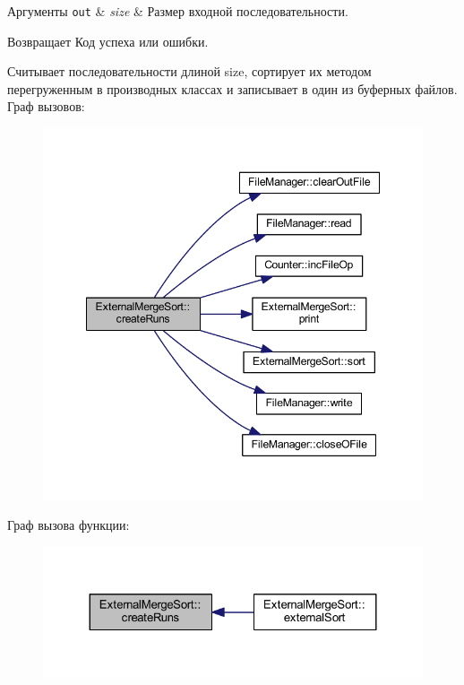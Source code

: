 \begin{DoxyParams}[1]{Аргументы}
\mbox{\tt out}  & {\em size} & Размер входной последовательности. \\
\hline
\end{DoxyParams}
\begin{DoxyReturn}{Возвращает}
Код успеха или ошибки.
\end{DoxyReturn}
Считывает последовательности длиной size, сортирует их методом перегруженным в производных классах и записывает в один из буферных файлов. Граф вызовов\+:\nopagebreak
\begin{figure}[H]
\begin{center}
\leavevmode
\includegraphics[width=348pt]{class_external_merge_sort_aae72743234c39c35a3460fecefa3a1f0_cgraph}
\end{center}
\end{figure}
Граф вызова функции\+:\nopagebreak
\begin{figure}[H]
\begin{center}
\leavevmode
\includegraphics[width=324pt]{class_external_merge_sort_aae72743234c39c35a3460fecefa3a1f0_icgraph}
\end{center}
\end{figure}
\hypertarget{class_external_merge_sort_a0f17e02ed3c66bc241123cc1ee01aded}{}\label{class_external_merge_sort_a0f17e02ed3c66bc241123cc1ee01aded} 
